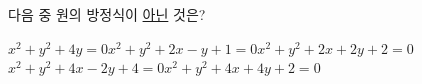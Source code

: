 다음 중 원의 방정식이 \underline{아닌} 것은?
\begin{choicesv}{$x^2+y^2+4y=0$}{$x^2+y^2+2x-y+1=0$}{$x^2+y^2+2x+2y+2=0$}{$x^2+y^2+4x-2y+4=0$}{$x^2+y^2+4x+4y+2=0$}\end{choicesv}
